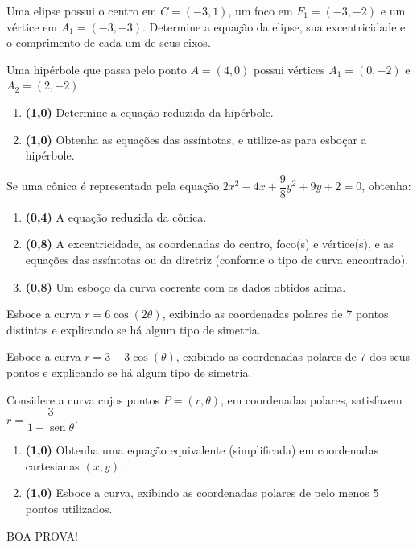 \documentclass[12pt,a4paper]{article}
\newcommand{\fixme}{{\color{red}(...)}}
\newcommand*\sen{\operatorname{sen}}
\begin{document}
\begin{ExerciseList}
\Exercise[title={2,0}] Uma elipse possui o centro em $C=(-3,1)$, um foco em $F_1=(-3,-2)$ e um vértice em $A_1=(-3,-3)$. Determine a equação da elipse, sua excentricidade e o comprimento de cada um de seus eixos.
\Answer \fixme

\Exercise%
Uma hipérbole que passa pelo ponto $A=(4,0)$ possui vértices $A_1=(0,-2)$ e $A_2=(2, -2)$.
\begin{enumerate}
\item \textbf{(1,0)} Determine a equação reduzida da hipérbole.
\item \textbf{(1,0)} Obtenha as equações das assíntotas, e utilize-as para esboçar a hipérbole.
\end{enumerate}
\Answer \fixme

\Exercise%
Se uma cônica é representada pela equação $2x^2 - 4x + \dfrac{9}{8}y^2 + 9y + 2 = 0$, obtenha:
\begin{enumerate}
\item \textbf{(0,4)} A equação reduzida da cônica.
\item \textbf{(0,8)} A excentricidade, as coordenadas do centro, foco(s) e vértice(s), e as equações das assíntotas ou da diretriz (conforme o tipo de curva encontrado).
\item \textbf{(0,8)} Um esboço da curva coerente com os dados obtidos acima.
\end{enumerate}
\Answer \fixme

\Exercise[title={2,0}] Esboce a curva $r=6\cos(2\theta)$, exibindo as coordenadas polares de 7 pontos distintos e explicando se há algum tipo de simetria.
\Answer \fixme

\Exercise[title={2,0}] Esboce a curva $r=3-3\cos \left(\theta \right)$, exibindo as coordenadas polares de 7 dos seus pontos e explicando se há algum tipo de simetria.
\Answer \fixme

\Exercise%
Considere a curva cujos pontos $P=(r, \theta)$, em coordenadas polares, satisfazem $r = \dfrac{3}{1-\sen{\theta}}$.
\begin{enumerate}
\item \textbf{(1,0)} Obtenha uma equação equivalente (simplificada) em coordenadas cartesianas $(x,y)$.
\item \textbf{(1,0)} Esboce a curva, exibindo as coordenadas polares de pelo menos 5 pontos utilizados.
\end{enumerate}
\Answer \fixme
\end{ExerciseList}

\begin{center}
BOA PROVA!
\end{center}

\restoregeometry
\end{document}
